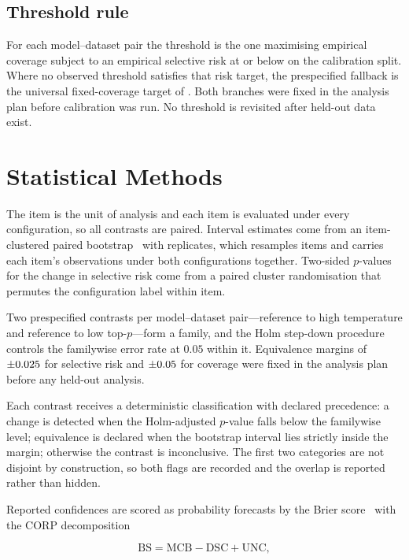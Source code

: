 \documentclass[information,article,submit,moreauthors]{Definitions/mdpi}
\begin{document}
\subsection{Threshold rule}

For each model--dataset pair the threshold is the one maximising empirical
coverage subject to an empirical selective risk at or below \TargetRisk{} on the
calibration split. Where no observed threshold satisfies that risk target, the
prespecified fallback is the universal fixed-coverage target of
\FixedCoverageTarget{}. Both branches were fixed in the analysis plan before
calibration was run. No threshold is revisited after held-out data exist.

\section{Statistical Methods}
\label{sec:methods}

The item is the unit of analysis and each item is evaluated under every
configuration, so all contrasts are paired. Interval estimates come from an
item-clustered paired bootstrap~\cite{efron1979} with \BootstrapReplicates{}
replicates, which resamples items and carries each item's observations under
both configurations together. Two-sided $p$-values for the change in selective
risk come from a paired cluster randomisation that permutes the configuration
label within item.

Two prespecified contrasts per model--dataset pair---reference to high
temperature and reference to low top-$p$---form a family, and the Holm
step-down procedure~\cite{holm1979} controls the familywise error rate at
$0.05$ within it. Equivalence margins of $\pm0.025{}$ for selective risk
and $\pm0.05{}$ for coverage were fixed in the analysis plan before
any held-out analysis.

Each contrast receives a deterministic classification with declared precedence:
a change is detected when the Holm-adjusted $p$-value falls below the familywise
level; equivalence is declared when the bootstrap interval lies strictly inside
the margin; otherwise the contrast is inconclusive. The first two categories are
not disjoint by construction, so both flags are recorded and the overlap is
reported rather than hidden.

Reported confidences are scored as probability forecasts by the Brier
score~\cite{brier1950} with the CORP decomposition~\cite{dimitriadis2021corp}

\begin{equation}
\mathrm{BS} = \mathrm{MCB} - \mathrm{DSC} + \mathrm{UNC},
\label{eq:corp}
\end{equation}
\end{document}

